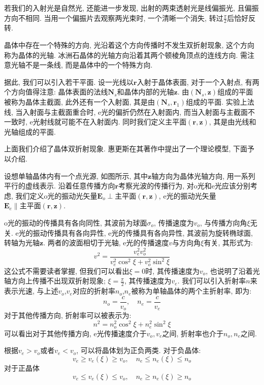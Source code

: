 
若我们的入射光是自然光, 还能进一步发现, 出射的两束透射光是线偏振光, 且偏振方向不相同. 当用一个偏振片去观察两光束时, 一个清晰一个消失, 转过$\frac{\pi}{2}$后恰好反转.


晶体中存在一个特殊的方向, 光沿着这个方向传播时不发生双折射现象, 这个方向称为晶体的光轴. 冰洲石晶体的光轴方向沿着其两个顿棱角顶点的连线方向. 需注意光轴不是一条线, 而是晶体中的一个特殊方向.

据此, 我们可以引入若干平面. 设一光线以$\bm{r}$入射于晶体表面, 对于一个入射点, 有两个方向值得注意: 晶体表面的法线$\bm{N}_s$和晶体内部的光轴$\bm{z}$. 由$(\bm{N}_s,\bm{z})$组成的平面被称为晶体主截面, 此外还有一个入射面, 其是由$(\bm{N}_s,\bm{r}_1)$组成的平面. 实验上法线, 当入射面与主截面重合时, e光的偏折仍然在入射面内, 而当入射面与主截面不一致时, e光射线就可能不在入射面内. 同时我们定义主平面$(\bm{r},\bm{z})$, 其是由光线和光轴组成的平面.

上面我们介绍了晶体双折射现象. 惠更斯在其著作中提出了一个理论模型, 下面予以介绍.


设想单轴晶体内有一个点光源, 如图所示, 其中$\bm{z}$轴方向为晶体光轴方向, 用一系列平行的虚线表示. 沿着任意传播方向$\bm{r}$考察光波的传播行为, 对o光和e光应该分别考虑, 我们定义o光的振动光矢量$\bm{E}_o\perp\text{主平面}(\bm{r},\bm{z})$, e光的振动光矢量$\bm{E}_e\parallel\text{主平面}(\bm{r},\bm{z})$.

o光的振动的传播具有各向同性, 其波前为球面$\sigma_o$, 传播速度为$v_o$, 与传播方向角$\xi$无关. e光的振动传播具有各向异性, e光的传播具有各向异性, 其波前为旋转椭球面, 转轴为光轴$\bm{z}$. 两者的波面相切于光轴, e光的传播速度$v$与方向角$\xi$有关, 其形式为:
\[
v^2 = \frac{v_e^2v_o^2}{v_e^2\cos^2\xi+v_o^2\sin^2\xi}
\]
这公式不需要读者掌握, 但我们可以看出$\xi=0$时, 其传播速度为$v_o$, 也说明了沿着光轴方向上传播不出现双折射现象; $\xi=\frac{\pi}{2}$, 其传播速度为$v_e$. 我们可以引入折射率$n$来表示光速, 与上述$v_o$,$v_e$对应的折射率$n_o$,$n_e$被称为单轴晶体的两个主折射率, 即为:
\[
n_o = \frac{c}{v_o}, \quad n_e =\frac{c}{v_e}
\]
对于其他传播方向, 折射率可以被表示为:
\[
n^2 = n_o^2\cos^2\xi+n_e^2\sin^2\xi
\]
可以看出对于其他传播方向, e光传播速度介于$v_o,v_e$之间, 折射率也介于$n_o,n_e$之间.

根据$v_e>v_o$或者$v_e<v_o$, 可以将晶体划为正负两类. 对于负晶体:
\[
v_e \geq v_e(\xi) \geq v_o , \quad n_e \leq n_e(\xi) \leq n_o
\]
对于正晶体
\[
v_e \leq v_e(\xi) \leq v_o , \quad n_e \geq n_e(\xi) \geq n_o
\]

